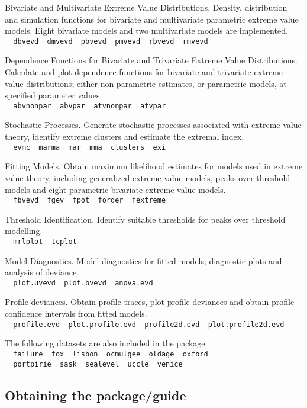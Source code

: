 \documentclass[11pt,a4paper]{article}
\begin{document}
Bivariate and Multivariate Extreme Value Distributions. Density, distribution and simulation functions for bivariate and multivariate parametric extreme value models. Eight bivariate models and two multivariate models are implemented.\\
\verb+  dbvevd  dmvevd  pbvevd  pmvevd  rbvevd  rmvevd+

Dependence Functions for Bivariate and Trivariate Extreme Value Distributions. Calculate and plot dependence functions for bivariate and trivariate extreme value distributions; either non-parametric estimates, or parametric models, at specified parameter values.\\  
\verb+  abvnonpar  abvpar  atvnonpar  atvpar+

Stochastic Processes. Generate stochastic processes associated with extreme value theory, identify extreme clusters and estimate the extremal index.\\
\verb+  evmc  marma  mar  mma  clusters  exi+

Fitting Models. Obtain maximum likelihood estimates for models used in extreme value theory, including generalized extreme value models, peaks over threshold models and eight parametric bivariate extreme value models.\\
\verb+  fbvevd  fgev  fpot  forder  fextreme+

Threshold Identification. Identify suitable thresholds for peaks over threshold modelling.\\
\verb+  mrlplot  tcplot+ 

Model Diagnostics. Model diagnostics for fitted models; diagnostic plots and analysis of deviance.\\  
\verb+  plot.uvevd  plot.bvevd  anova.evd+

Profile deviances. Obtain profile traces, plot profile deviances and obtain profile confidence intervals from fitted models.\\ 
\verb+  profile.evd  plot.profile.evd  profile2d.evd  plot.profile2d.evd+

The following datasets are also included in the package.\\
\verb+  failure  fox  lisbon  ocmulgee  oldage  oxford+\\ 
\verb+  portpirie  sask  sealevel  uccle  venice+

\subsection{Obtaining the package/guide}
\end{document}
